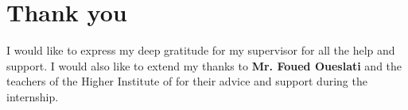 \chapter*{Thank you}
I would like to express my deep gratitude for my supervisor for all the help and support. I would also like to extend my thanks to \textbf{Mr. Foued Oueslati} and the teachers of the Higher Institute of for their advice and support during the internship.

